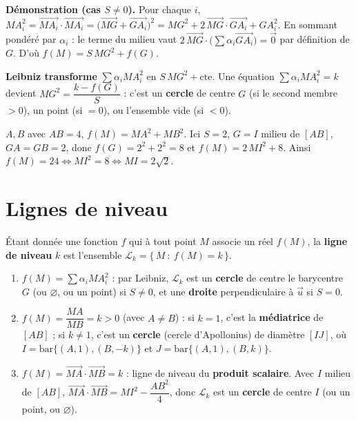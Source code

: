 \begin{remarque}
\textbf{Démonstration (cas $S\neq0$).} Pour chaque $i$,
$MA_i^{2}=\overrightarrow{MA_i}\cdot\overrightarrow{MA_i}=\big(\overrightarrow{MG}+\overrightarrow{GA_i}\big)^{2}
=MG^{2}+2\,\overrightarrow{MG}\cdot\overrightarrow{GA_i}+GA_i^{2}$.
En sommant pondéré par $\alpha_i$ : le terme du milieu vaut
$2\,\overrightarrow{MG}\cdot\big(\sum\alpha_i\overrightarrow{GA_i}\big)=\vec0$ par définition de $G$.
D'où $f(M)=S\,MG^{2}+f(G)$.
\end{remarque}

\begin{aretenir}
\textbf{Leibniz transforme} $\sum\alpha_i MA_i^{2}$ en $S\,MG^{2}+\text{cte}$. Une équation $\sum\alpha_i MA_i^{2}=k$ devient $MG^{2}=\dfrac{k-f(G)}{S}$ : c'est un \textbf{cercle} de centre $G$ (si le second membre $>0$), un point (si $=0$), ou l'ensemble vide (si $<0$).
\end{aretenir}

\begin{exemple}
$A,B$ avec $AB=4$, $f(M)=MA^{2}+MB^{2}$. Ici $S=2$, $G=I$ milieu de $[AB]$, $GA=GB=2$,
donc $f(G)=2^{2}+2^{2}=8$ et $f(M)=2\,MI^{2}+8$. Ainsi $f(M)=24\iff MI^2=8\iff MI=2\sqrt2$.
\end{exemple}

\section{Lignes de niveau}

\begin{definition}
Étant donnée une fonction $f$ qui à tout point $M$ associe un réel $f(M)$, la \textbf{ligne de niveau} $k$ est l'ensemble $\mathcal L_k=\{\,M\ :\ f(M)=k\,\}$.
\end{definition}

\begin{propriete}
\begin{enumerate}[label=\arabic*)]
\item $f(M)=\sum\alpha_i MA_i^{2}$ : par Leibniz, $\mathcal L_k$ est un \textbf{cercle} de centre le barycentre $G$ (ou $\varnothing$, ou un point) si $S\neq0$, et une \textbf{droite} perpendiculaire à $\vec u$ si $S=0$.
\item $f(M)=\dfrac{MA}{MB}=k>0$ (avec $A\neq B$) : si $k=1$, c'est la \textbf{médiatrice} de $[AB]$ ; si $k\neq1$, c'est un \textbf{cercle} (cercle d'Apollonius) de diamètre $[IJ]$, où $I=\mathrm{bar}\{(A,1),(B,-k)\}$ et $J=\mathrm{bar}\{(A,1),(B,k)\}$.
\item $f(M)=\overrightarrow{MA}\cdot\overrightarrow{MB}=k$ : ligne de niveau du \textbf{produit scalaire}. Avec $I$ milieu de $[AB]$, $\overrightarrow{MA}\cdot\overrightarrow{MB}=MI^{2}-\dfrac{AB^{2}}{4}$, donc $\mathcal L_k$ est un \textbf{cercle} de centre $I$ (ou un point, ou $\varnothing$).
\end{enumerate}
\end{propriete}

